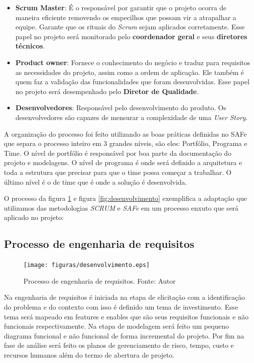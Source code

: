 \begin{itemize}
    \item \textbf{Scrum Master}: É o responsável por garantir que o projeto ocorra de maneira eficiente removendo os empecilhos que possam vir a atrapalhar a equipe. Garante que os rituais do \textit{Scrum} sejam aplicados corretamente. Esse papel no projeto será monitorado pelo \textbf{coordenador geral} e seus \textbf{diretores técnicos}.
    \item \textbf{Product owner}: Fornece o conhecimento do negócio e traduz para requisitos as necessidades do projeto, assim como a ordem de aplicação. Ele também é quem faz a validação das funcionalidades que foram desenvolvidas. Esse papel no projeto será desempenhado pelo \textbf{Diretor de Qualidade}.
    \item \textbf{Desenvolvedores}: Responsável pelo desenvolvimento do produto. Os desenvolvedores são capazes de mensurar a complexidade de uma \textit{User Story}.
\end{itemize}

A organização do processo foi feito utilizando as boas práticas definidas no SAFe que separa o processo inteiro em 3 grandes níveis, são eles: Portfólio, Programa e Time. O nível de portfólio é responsável por boa parte da documentação do projeto e modelagens. O nível de programa é onde será definido a arquitetura e toda a estrutura que precisar para que o time possa começar a trabalhar. O último nível é o de time que é onde a solução é desenvolvida.

O processo da figura \ref{fig:requisitos} e figura \ref{fig:desenvolvimento} exemplifica a adaptação que utilizamos das metodologias \textit{SCRUM} e \textit{SAFe} em um processo enxuto que será aplicado no projeto:

\subsection{Processo de engenharia de requisitos}

\begin{figure}[ht]
	\centering
    \texttt{[image: figuras/desenvolvimento.eps]}
    \caption[Processo de engenharia de requisitos.]{Processo de engenharia de requisitos. Fonte: Autor}
	\label{fig:requisitos}
\end{figure}

Na engenharia de requisitos é iniciada na etapa de elicitação com a identificação do problema e do contexto com isso é definido um tema de investimento. Esse tema será mapeado em features e enables que são seus requisitos funcionais e não funcionais respectivamente. Na etapa de modelagem será feito um pequeno diagrama funcional e não funcional de forma incremental do projeto. Por fim na fase de análise será feito os planos de gerenciamento de risco, tempo, custo e recursos humanos além do termo de abertura de projeto.

